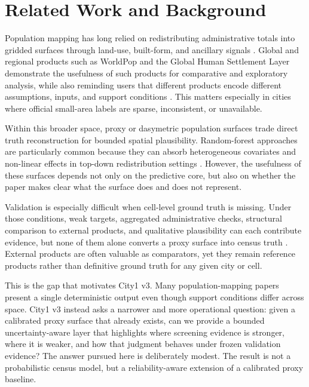\section{Related Work and Background}

Population mapping has long relied on redistributing administrative totals into gridded surfaces through land-use, built-form, and ancillary signals \cite{Mennis2009,Leyk2019}. Global and regional products such as WorldPop and the Global Human Settlement Layer demonstrate the usefulness of such products for comparative and exploratory analysis, while also reminding users that different products encode different assumptions, inputs, and support conditions \cite{Stevens2015,WorldPopMethods,GHSL2023,Lloyd2017}. This matters especially in cities where official small-area labels are sparse, inconsistent, or unavailable.

Within this broader space, proxy or dasymetric population surfaces trade direct truth reconstruction for bounded spatial plausibility. Random-forest approaches are particularly common because they can absorb heterogeneous covariates and non-linear effects in top-down redistribution settings \cite{Stevens2015,Qiu2020}. However, the usefulness of these surfaces depends not only on the predictive core, but also on whether the paper makes clear what the surface does and does not represent.

Validation is especially difficult when cell-level ground truth is missing. Under those conditions, weak targets, aggregated administrative checks, structural comparison to external products, and qualitative plausibility can each contribute evidence, but none of them alone converts a proxy surface into census truth \cite{Leyk2019,Thomson2021,Yin2021}. External products are often valuable as comparators, yet they remain reference products rather than definitive ground truth for any given city or cell.

This is the gap that motivates City1 v3. Many population-mapping papers present a single deterministic output even though support conditions differ across space. City1 v3 instead asks a narrower and more operational question: given a calibrated proxy surface that already exists, can we provide a bounded uncertainty-aware layer that highlights where screening evidence is stronger, where it is weaker, and how that judgment behaves under frozen validation evidence? The answer pursued here is deliberately modest. The result is not a probabilistic census model, but a reliability-aware extension of a calibrated proxy baseline.

